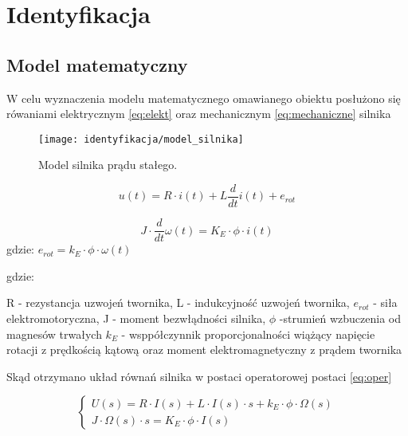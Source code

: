 \chapter{Identyfikacja}
\label{cha:Identyfikacja}

\section{Model matematyczny}
\label{sec:model_mat}
W celu wyznaczenia modelu matematycznego omawianego obiektu posłużono się rówaniami elektrycznym \ref{eq:elekt} oraz mechanicznym \ref{eq:mechaniczne} silnika
\begin{figure}[H]

	\texttt{[image: identyfikacja/model\_silnika]}
	\centering
	\caption{Model silnika prądu stałego.}
	\label{fig:Schemat}
\end{figure}



\begin{equation}
\label{eq:elekt}
u(t)= R \cdot i(t) + L \frac{d}{dt}i(t) + e_{rot}
\end{equation}

\begin{equation}
\label{eq:mechaniczne}
J \cdot \frac{d}{dt} \omega(t) = K_{E} \cdot \phi \cdot i(t)
\end{equation}
gdzie:
\newline $e_{rot} = k_{E} \cdot \phi \cdot \omega(t)$

gdzie:

R - rezystancja uzwojeń twornika,
L - indukcyjność uzwojeń twornika,
$e_{rot}$ - siła elektromotoryczna,
J - moment bezwłądności silnika,
$\phi$ -strumień wzbuczenia od magnesów trwałych
$k_E$ - wsppółczynnik proporcjonalności wiążący napięcie rotacji z prędkością kątową oraz moment elektromagnetyczny z prądem twornika%
 

Skąd otrzymano układ równań silnika w postaci operatorowej postaci \ref{eq:oper}

\begin{equation}
\label{eq:oper}
\left\{ \begin{array}{ll}
U(s)  = R \cdot I(s) + L \cdot I(s) \cdot s + k_{E} \cdot \phi \cdot \Omega(s)\\
J \cdot \Omega(s) \cdot s  = K_{E} \cdot \phi \cdot I(s)
\end{array} \right.
\end{equation}

